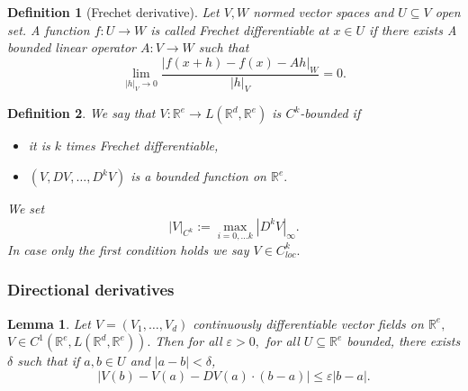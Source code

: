 \documentclass{article}
\newcommand{\R}{\mathbb{R}}
\newtheorem{definition}{Definition}
\newtheorem{lemma}[theorem]{Lemma}
\begin{document}
\begin{definition}[Frechet derivative]
    Let $V, W$ normed vector spaces and $U \subseteq V$ open set. 
    A function $f:U \rightarrow W$ is called \textit{Frechet differentiable} at $x \in U$ if there exists A
    bounded linear operator $A:V \rightarrow W$ such that
    \begin{equation}
        \lim_{|h|_V \rightarrow 0} \frac{|f(x + h) - f(x) - A h|_W}{|h|_V} = 0.
    \end{equation}
\end{definition}

\begin{definition}
    We say that $V: \R^e \rightarrow L(\R^d, \R^e)$ is $C^k$-bounded if
    \begin{itemize}
        \item it is $k$ times Frechet differentiable,
        \item $(V, DV, \ldots, D^k V)$ is a bounded function on $\R^e.$
    \end{itemize}
    We set
    \begin{equation}
        |V|_{C^k} := \max_{i=0, \ldots k} |D^k V|_\infty.
    \end{equation}
    In case only the first condition holds we say $V \in C^k_{loc}.$
\end{definition}

\subsubsection{Directional derivatives}

\begin{lemma}
    Let $V = (V_1, \ldots, V_d)$ continuously differentiable vector fields on $\R^e,$ $V \in C^1(\R^e, L(\R^d,\R^e)).$
    Then for all $\varepsilon > 0,$ for all $U \subseteq \R^e$ bounded, there exists $\delta$ such that if $a,b \in U$ and $|a-b|<\delta$, 
    \begin{equation}
        |V(b) - V(a) - DV(a) \cdot (b - a)| \leq \varepsilon |b - a|. 
    \end{equation}
\end{lemma}
\end{document}

